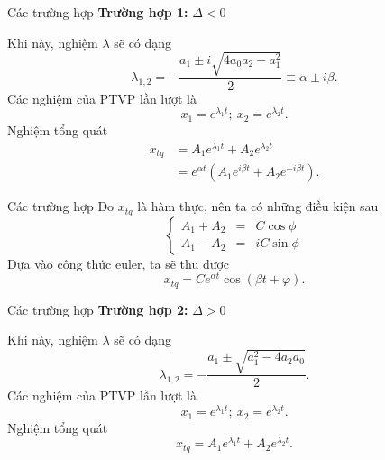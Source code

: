 \begin{frame}{Các trường hợp}
    \textbf{Trường hợp 1:} \(\Delta < 0\)
    \vspace{2mm}

    Khi này, nghiệm \(\lambda\) sẽ có dạng
    \begin{equation*}
    \displaystyle 
        \lambda_{1,2} = -\frac{a_1 \pm i \sqrt{4 a_0 a_2 - a_1^2}}{2} \equiv \alpha \pm i \beta.
    \end{equation*}
    Các nghiệm của PTVP lần lượt là
    \begin{equation*}
        x_1 =  e^{\lambda_1 t}; \ x_2 =  e^{\lambda_2 t}.
    \end{equation*}
    Nghiệm tổng quát
    \begin{equation*}
    \begin{split}
        x_{tq} &= A_1 e^{\lambda_1 t} + A_2 e^{\lambda_2 t} \\
        &= e^{\alpha t} \left( A_1 e^{i\beta t} + A_2 e^{-i\beta t} \right).
    \end{split}
    \end{equation*}
\end{frame}
\begin{frame}{Các trường hợp}
    Do \(x_{tq}\) là hàm thực, nên ta có những điều kiện sau
    \begin{equation*}
    \left\{
    \begin{array}{ccc}
    A_1 + A_2 &=& C \cos \phi \\
    A_1 - A_2 &=& i C \sin \phi
    \end{array}
    \right.
    \end{equation*}
    Dựa vào công thức euler, ta sẽ thu được
    \begin{equation*}
        x_{tq} = C e^{\alpha t} \cos{(\beta t + \varphi)}.
    \end{equation*}
\end{frame}
\begin{frame}{Các trường hợp}
    \textbf{Trường hợp 2:} \(\Delta > 0\)
    \vspace{2mm}

    Khi này, nghiệm \(\lambda\) sẽ có dạng
    \begin{equation*}
        \lambda_{1,2} = -\frac{a_1 \pm  \sqrt{a_1^2-4 a_2 a_0}}{2}.
    \end{equation*}
    Các nghiệm của PTVP lần lượt là
    \begin{equation*}
        x_1 = e^{\lambda_1 t} ; \ x_2 = e^{\lambda_2 t}.
    \end{equation*}
    Nghiệm tổng quát
    \begin{equation*}
        x_{tq} = A_1 e^{\lambda_1 t} + A_2e^{\lambda_2 t}.
    \end{equation*}
\end{frame}
